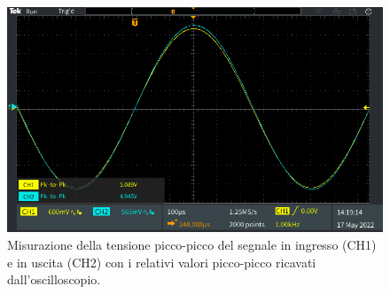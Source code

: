 \begin{figure}[h!]
	\centering
	\includegraphics[width=0.7\linewidth]{./ImageFiles/Laboratorio 2/TEK00012}
	\caption{Misurazione della tensione picco-picco del segnale in ingresso (CH1) e in uscita (CH2) con i relativi valori picco-picco ricavati dall'oscilloscopio.}
	\label{fig:emitterfollwer_misurepiccopicco}
\end{figure}

